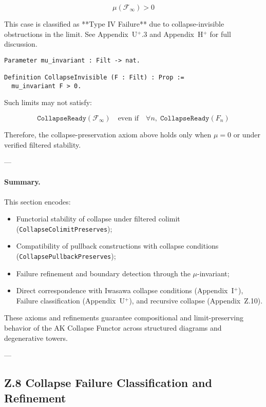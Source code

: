 \documentclass[11pt]{article}
\begin{document}
\[
\mu(\mathcal{F}_\infty) > 0
\]

This case is classified as **Type IV Failure** due to collapse-invisible obstructions in the limit. See Appendix~U$^+$.3 and Appendix~H$^+$ for full discussion.

\begin{lstlisting}[language=Coq]
Parameter mu_invariant : Filt -> nat.

Definition CollapseInvisible (F : Filt) : Prop :=
  mu_invariant F > 0.
\end{lstlisting}

Such limits may not satisfy:

\[
\texttt{CollapseReady}(\mathcal{F}_\infty)
\quad \text{even if} \quad \forall n,\; \texttt{CollapseReady}(F_n)
\]

Therefore, the collapse-preservation axiom above holds only when \( \mu = 0 \) or under verified filtered stability.

---

\paragraph{Summary.}
This section encodes:

\begin{itemize}
  \item Functorial stability of collapse under filtered colimit (\texttt{CollapseColimitPreserves});
  \item Compatibility of pullback constructions with collapse conditions (\texttt{CollapsePullbackPreserves});
  \item Failure refinement and boundary detection through the $\mu$-invariant;
  \item Direct correspondence with Iwasawa collapse conditions (Appendix~I$^+$), Failure classification (Appendix~U$^+$), and recursive collapse (Appendix~Z.10).
\end{itemize}

These axioms and refinements guarantee compositional and limit-preserving behavior of the AK Collapse Functor across structured diagrams and degenerative towers.


---

\subsection*{Z.8 Collapse Failure Classification and Refinement}
\end{document}
